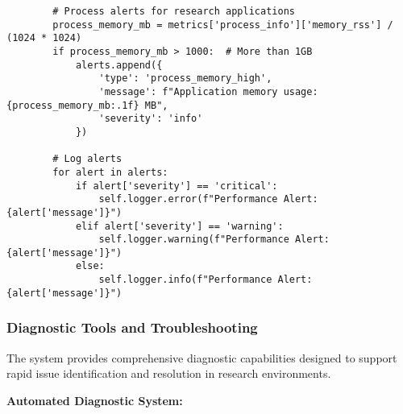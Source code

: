 \documentclass[12pt,a4paper]{article}
\begin{document}
\begin{verbatim}
        # Process alerts for research applications
        process_memory_mb = metrics['process_info']['memory_rss'] / (1024 * 1024)
        if process_memory_mb > 1000:  # More than 1GB
            alerts.append({
                'type': 'process_memory_high',
                'message': f"Application memory usage: {process_memory_mb:.1f} MB",
                'severity': 'info'
            })
        
        # Log alerts
        for alert in alerts:
            if alert['severity'] == 'critical':
                self.logger.error(f"Performance Alert: {alert['message']}")
            elif alert['severity'] == 'warning':
                self.logger.warning(f"Performance Alert: {alert['message']}")
            else:
                self.logger.info(f"Performance Alert: {alert['message']}")
\end{verbatim}

\subsubsection{Diagnostic Tools and Troubleshooting}

The system provides comprehensive diagnostic capabilities designed to support rapid issue identification and resolution
in research environments.

\textbf{Automated Diagnostic System:}
\end{document}
